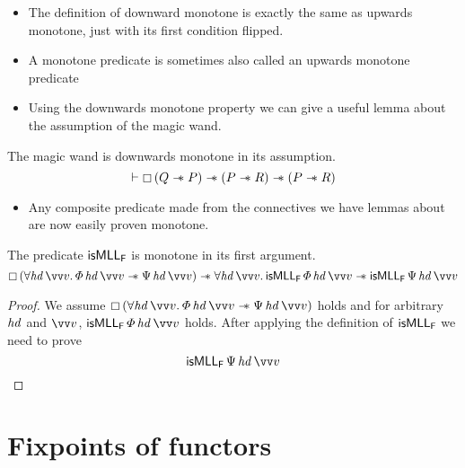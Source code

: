 \documentclass[thesis.tex]{subfiles}
\begin{document}
\begin{itemize}
    \item The definition of downward monotone is exactly the same as upwards monotone, just with its first condition flipped.
    \item A monotone predicate is sometimes also called an upwards monotone predicate
    \item Using the downwards monotone property we can give a useful lemma about the assumption of the magic wand.
\end{itemize}
\begin{lemma}
    \label{lem:wandassmono}
    The magic wand is downwards monotone in its assumption.
    \[\proves\always{(\propB\wand\prop)}\wand(\prop\wand\propC)\wand(\prop\wand\propC)\]
\end{lemma}
\begin{itemize}
    \item Any composite predicate made from the connectives we have lemmas about are now easily proven monotone.
\end{itemize}
\begin{example}
    The predicate $\textsf{\upshape isMLL}_{\textsf{\upshape F}}$ is monotone in its first argument.
    \[
        \always{(\All \langv{hd}\, \vect{v}. \pred\, \langv{hd}\, \vect{v} \wand \predB\, \langv{hd}\, \vect{v})} \wand \All \langv{hd}\, \vect{v}. \isMLL_\hopred\, \pred\, \langv{hd}\, \vect{v} \wand \isMLL_\hopred\, \predB\, \langv{hd}\, \vect{v}
    \]
\end{example}
\begin{proof}
    We assume $\always{(\All \langv{hd}\, \vect{v}. \pred\, \langv{hd}\, \vect{v} \wand \predB\, \langv{hd}\, \vect{v})}$ holds and for arbitrary $\mathit{hd}$ and $\vect{v}$, $\isMLL_\hopred\, \pred\, \langv{hd}\, \vect{v}$ holds.
    After applying the definition of $\textsf{\upshape isMLL}_{\textsf{\upshape F}}$ we need to prove \[\isMLL_\hopred\, \predB\, \langv{hd}\, \vect{v}\]

\end{proof}

\section{Fixpoints of functors}
\label{sec:fixpoint}
\end{document}
